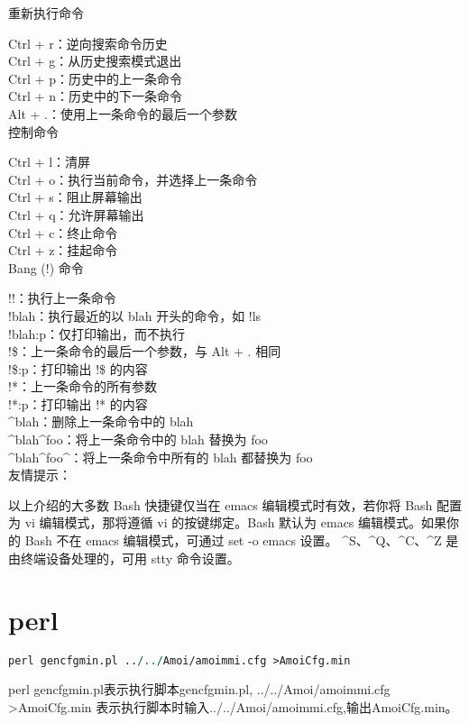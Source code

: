 \documentclass[a4paper,11pt]{book}
\begin{document}
重新执行命令

    Ctrl + r：逆向搜索命令历史\\
    Ctrl + g：从历史搜索模式退出\\
    Ctrl + p：历史中的上一条命令\\
    Ctrl + n：历史中的下一条命令\\
    Alt + .：使用上一条命令的最后一个参数\\

控制命令

    Ctrl + l：清屏\\
    Ctrl + o：执行当前命令，并选择上一条命令\\
    Ctrl + s：阻止屏幕输出\\
    Ctrl + q：允许屏幕输出\\
    Ctrl + c：终止命令\\
    Ctrl + z：挂起命令\\

Bang (!) 命令

    !!：执行上一条命令\\
    !blah：执行最近的以 blah 开头的命令，如 !ls\\
    !blah:p：仅打印输出，而不执行\\
    !\$：上一条命令的最后一个参数，与 Alt + . 相同\\
    !\$:p：打印输出 !\$ 的内容\\
    !*：上一条命令的所有参数\\
    !*:p：打印输出 !* 的内容\\
    \^{}blah：删除上一条命令中的 blah\\
    \^{}blah\^{}foo：将上一条命令中的 blah 替换为 foo\\
    \^{}blah\^{}foo\^{}：将上一条命令中所有的 blah 都替换为 foo\\

友情提示：

    以上介绍的大多数 Bash 快捷键仅当在 emacs 编辑模式时有效，若你将 Bash 配置为 vi 编辑模式，那将遵循 vi 的按键绑定。Bash 默认为 emacs 编辑模式。如果你的 Bash 不在 emacs 编辑模式，可通过 set -o emacs 设置。
\^{}S、\^{}Q、\^{}C、\^{}Z 是由终端设备处理的，可用 stty 命令设置。

\chapter{perl}
\begin{lstlisting}[language=perl]
perl gencfgmin.pl ../../Amoi/amoimmi.cfg >AmoiCfg.min
\end{lstlisting}
perl gencfgmin.pl表示执行脚本gencfgmin.pl, ../../Amoi/amoimmi.cfg >AmoiCfg.min
表示执行脚本时输入../../Amoi/amoimmi.cfg,输出AmoiCfg.min。
\end{document}
